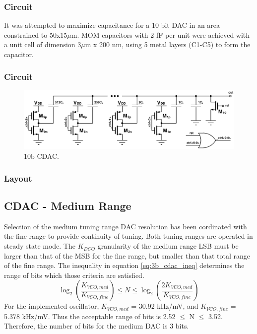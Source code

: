 		\subsubsection{Circuit}
		It was attempted to maximize capacitance for a 10 bit DAC in an area constrained to 50x15$\mu$m. MOM capacitors with 2 fF per unit were achieved with a unit cell of dimension 3$\mu$m x 200 nm, using 5 metal layers (C1-C5) to form the capacitor.
	
		\subsubsection{Circuit}
			\begin{figure}[htb!]
			        \centering
			        \includegraphics[width=\textwidth, angle=0]{./figs/design/cdac_10b}
			    \caption{10b CDAC.}
			    \label{fig:10b_cdac_cir}
			\end{figure}

		\subsubsection{Layout}
	\FloatBarrier
	\subsection{CDAC - Medium Range}
	Selection of the medium tuning range DAC resolution has been cordinated with the fine range to provide continuity of tuning. Both tuning ranges are operated in steady state mode. The $K_{DCO}$ granularity of the medium range LSB must be larger than that of the MSB for the fine range, but smaller than that total range of the fine range. The inequality in equation \ref{eq:3b_cdac_ineq} determines the range of bits which those criteria are satisfied.
	\begin{equation}
		\log_2\left( \frac{K_{VCO,med}}{K_{VCO,fine}}\right) \leq N \leq \log_2\left( \frac{2K_{VCO,med}}{K_{VCO,fine}}\right)
	\end{equation}
	For the implemented oscillator, $K_{VCO,med}$ = 30.92 kHz/mV, and $K_{VCO,fine}$ = 5.378 kHz/mV. Thus the acceptable range of bits is 2.52 $\leq$ N $\leq$ 3.52. Therefore, the number of bits for the medium DAC is 3 bits.
